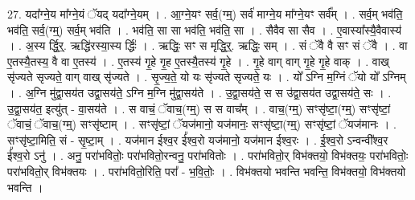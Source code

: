 \documentclass[17pt]{extarticle}
\begin{document}
27. यदा᳚ग्ने॒य मा᳚ग्ने॒यं ॅयद् यदा᳚ग्ने॒यम् । . आ॒ग्ने॒यꣳ सर्व॒(ग्म्॒) सर्व॑ माग्ने॒य मा᳚ग्ने॒यꣳ सर्व᳚म् । . सर्व॒म् भव॑ति॒ भव॑ति॒ सर्व॒(ग्म्॒) सर्व॒म् भव॑ति । . भव॑ति॒ सा सा भव॑ति॒ भव॑ति॒ सा । . सैवैव सा सैव । . ए॒वास्या᳚स्यै॒वैवास्य॑ । . अ॒स्य र्द्धि॒र्॒. ऋद्धि॑रस्या॒स्य र्द्धिः॑ । . ऋद्धिः॒ सꣳ स मृद्धि॒र्॒. ऋद्धिः॒ सम् । . सं ॅवै वै सꣳ सं ॅवै । . वा ए॒तस्यै॒तस्य॒ वै वा ए॒तस्य॑ । . ए॒तस्य॑ गृ॒हे गृ॒ह ए॒तस्यै॒तस्य॑ गृ॒हे । . गृ॒हे वाग् वाग् गृ॒हे गृ॒हे वाक् । . वाख् सृ॑ज्यते सृज्यते॒ वाग् वाख् सृ॑ज्यते । . सृ॒ज्य॒ते॒ यो यः सृ॑ज्यते सृज्यते॒ यः । . यो᳚ ऽग्नि म॒ग्निं ॅयो यो᳚ ऽग्निम् । . अ॒ग्नि मु॑द्वा॒सय॑त उद्वा॒सय॑ते॒ ऽग्नि म॒ग्नि मु॑द्वा॒सय॑ते । . उ॒द्वा॒सय॑ते॒ स स उ॑द्वा॒सय॑त उद्वा॒सय॑ते॒ सः । . उ॒द्वा॒सय॑त॒ इत्यु॑त् - वा॒सय॑ते । . स वाचं॒ ॅवाच॒(ग्म्॒) स स वाच᳚म् । . वाच॒(ग्म्॒) सꣳसृ॑ष्टा॒(ग्म्॒) सꣳसृ॑ष्टां॒ ॅवाचं॒ ॅवाच॒(ग्म्॒) सꣳसृ॑ष्टाम् । . सꣳसृ॑ष्टां॒ ॅयज॑मानो॒ यज॑मानः॒ सꣳसृ॑ष्टा॒(ग्म्॒) सꣳसृ॑ष्टां॒ ॅयज॑मानः । . सꣳसृ॑ष्टा॒मिति॒ सं - सृ॒ष्टा॒म् । . यज॑मान ईश्व॒र ई᳚श्व॒रो यज॑मानो॒ यज॑मान ईश्व॒रः । . ई॒श्व॒रो ऽन्वन्वी᳚श्व॒र ई᳚श्व॒रो ऽनु॑ । . अनु॒ परा॑भवितोः॒ परा॑भवितो॒रन्वनु॒ परा॑भवितोः । . परा॑भवितो॒र् विभ॑क्तयो॒ विभ॑क्तयः॒ परा॑भवितोः॒ परा॑भवितो॒र् विभ॑क्तयः । . परा॑भवितो॒रिति॒ परा᳚ - भ॒वि॒तोः॒ । . विभ॑क्तयो भवन्ति भवन्ति॒ विभ॑क्तयो॒ विभ॑क्तयो भवन्ति । \newline
\end{document}
